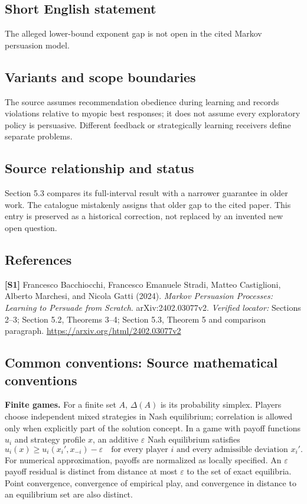 \documentclass[11pt,a4paper]{article}
\begin{document}
\subsection*{Short English statement}
The alleged lower-bound exponent gap is not open in the cited Markov persuasion model.
\subsection*{Variants and scope boundaries}
The source assumes recommendation obedience during learning and records violations relative to myopic best responses; it does not assume every exploratory policy is persuasive. Different feedback or strategically learning receivers define separate problems.
\subsection*{Source relationship and status}
Section 5.3 compares its full-interval result with a narrower guarantee in older work. The catalogue mistakenly assigns that older gap to the cited paper. This entry is preserved as a historical correction, not replaced by an invented new open question.
\subsection*{References}
\begingroup\footnotesize\raggedright
\textbf{[S1]} Francesco Bacchiocchi, Francesco Emanuele Stradi, Matteo Castiglioni, Alberto Marchesi, and Nicola Gatti (2024). \emph{Markov Persuasion Processes: Learning to Persuade from Scratch}. arXiv:2402.03077v2. \textit{Verified locator:} Sections 2--3; Section 5.2, Theorems 3--4; Section 5.3, Theorem 5 and comparison paragraph. \url{https://arxiv.org/html/2402.03077v2}
\par\endgroup

\subsection*{Common conventions: Source mathematical conventions}

\textbf{Finite games.} For a finite set $A$, $\Delta(A)$ is its probability
simplex. Players choose independent mixed strategies in Nash equilibrium;
correlation is allowed only when explicitly part of the solution concept.
In a game with payoff functions $u_i$ and strategy profile $x$, an additive
$\varepsilon$ Nash equilibrium satisfies
\[
 u_i(x)\geq u_i(x_i',x_{-i})-\varepsilon
 \quad\text{for every player $i$ and every admissible deviation $x_i'$}.
\]
For numerical approximation, payoffs are normalized as locally specified.
An $\varepsilon$ payoff residual is distinct from distance at most
$\varepsilon$ to the set of exact equilibria. Point convergence, convergence
of empirical play, and convergence in distance to an equilibrium set are
also distinct.
\end{document}
